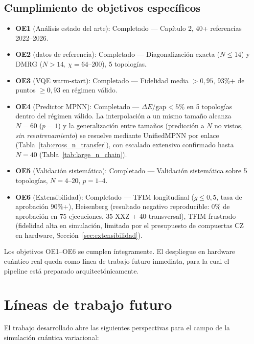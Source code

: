 \documentclass[11pt,a4paper,spanish]{book}
\begin{document}
\subsection{Cumplimiento de objetivos específicos}

\begin{itemize}
    \item \textbf{OE1} (Análisis estado del arte): Completado --- Capítulo 2, 40+ referencias 2022--2026.
    \item \textbf{OE2} (datos de referencia): Completado --- Diagonalización exacta ($N \leq 14$) y DMRG ($N > 14$, $\chi = 64$--$200$), 5 topologías.
    \item \textbf{OE3} (VQE warm-start): Completado --- Fidelidad media $> 0,95$, 93\%+ de puntos $\geq 0,93$ en régimen válido.
    \item \textbf{OE4} (Predictor MPNN): Completado --- $\Delta E/\text{gap} < 5\%$ en 5 topologías dentro del régimen válido. La interpolación a un mismo tamaño alcanza $N = 60$ ($p = 1$) y la generalización entre tamaños (predicción a $N$ no vistos, \emph{sin reentrenamiento}) se resuelve mediante UnifiedMPNN por enlace (Tabla~\ref{tab:cross_n_transfer}), con escalado extensivo confirmado hasta $N = 40$ (Tabla~\ref{tab:large_n_chain}).
    \item \textbf{OE5} (Validación sistemática): Completado --- Validación sistemática sobre 5 topologías, $N = 4$--$20$, $p = 1$--$4$.
    \item \textbf{OE6} (Extensibilidad): Completado --- TFIM longitudinal ($g \leq 0,5$, tasa de aprobación 90\%+), Heisenberg (resultado negativo reproducible: 0\% de aprobación en 75 ejecuciones, 35 XXZ + 40 transversal), TFIM frustrado (fidelidad alta en simulación, limitado por el presupuesto de compuertas CZ en hardware, Sección~\ref{sec:extensibilidad}).
\end{itemize}

Los objetivos OE1--OE6 se cumplen íntegramente. El despliegue en hardware cuántico real queda como línea de trabajo futuro inmediata, para la cual el pipeline está preparado arquitectónicamente.

\section{Líneas de trabajo futuro}

El trabajo desarrollado abre las siguientes perspectivas para el campo de la simulación cuántica variacional:
\end{document}
